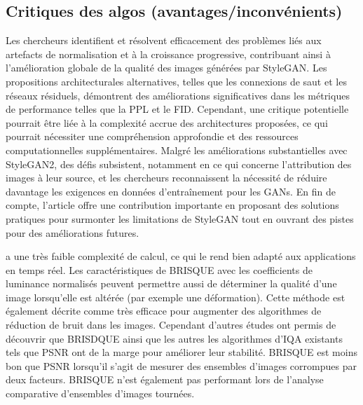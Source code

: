 \documentclass{ieeeaccess}
\begin{document}
\subsection{Critiques des algos (avantages/inconvénients)}

 Les chercheurs identifient et résolvent efficacement des problèmes liés aux artefacts de normalisation et à la croissance progressive, contribuant ainsi à l'amélioration globale de la qualité des images générées par StyleGAN. Les propositions architecturales alternatives, telles que les connexions de saut et les réseaux résiduels, démontrent des améliorations significatives dans les métriques de performance telles que la PPL et le FID. Cependant, une critique potentielle pourrait être liée à la complexité accrue des architectures proposées, ce qui pourrait nécessiter une compréhension approfondie et des ressources computationnelles supplémentaires. Malgré les améliorations substantielles avec StyleGAN2, des défis subsistent, notamment en ce qui concerne l'attribution des images à leur source, et les chercheurs reconnaissent la nécessité de réduire davantage les exigences en données d'entraînement pour les GANs. En fin de compte, l'article offre une contribution importante en proposant des solutions pratiques pour surmonter les limitations de StyleGAN tout en ouvrant des pistes pour des améliorations futures. 

 a une très faible complexité de calcul, ce qui le rend bien adapté aux applications en temps réel. Les caractéristiques de BRISQUE avec les coefficients de luminance normalisés peuvent permettre aussi de déterminer la qualité d’une image lorsqu’elle est altérée (par exemple une déformation). Cette méthode est également décrite comme très efficace pour augmenter des algorithmes de réduction de bruit dans les images. Cependant d’autres études ont permis de découvrir que BRISDQUE ainsi que les autres les algorithmes d’IQA existants tels que PSNR ont de la marge pour améliorer leur stabilité. BRISQUE est moins bon que PSNR lorsqu'il s'agit de mesurer des ensembles d'images corrompues par deux facteurs. BRISQUE n’est également pas performant lors de l'analyse comparative d'ensembles d'images tournées. 
\end{document}
